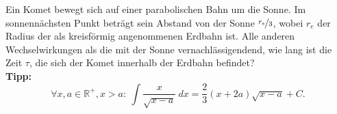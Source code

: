\begin{Exercise}[difficulty = 3, title = Komet, origin = {Auswahlwettbewerb IPhO 2007, 3. Runde}, label = cmcomet]
	Ein Komet bewegt sich auf einer parabolischen Bahn um die Sonne. Im sonnennächsten Punkt beträgt sein Abstand von der Sonne $\nicefrac{r_e}{3}$, wobei $r_e$ der Radius der als kreisförmig angenommenen Erdbahn ist. Alle anderen Wechselwirkungen als die mit der Sonne vernachlässigendend, wie lang ist die Zeit $\tau$, die sich der Komet innerhalb der Erdbahn befindet?\\
	\small{\textbf{Tipp:} \begin{equation}
		\label{cmcomet:int} \forall x,a \in \mathbb{R}^+, x>a:~
		\int \frac{x}{\sqrt{x-a}}~dx = \frac{2}{3}\left(x+2a\right)\sqrt{x-a}+C.\end{equation}}
\end{Exercise}
